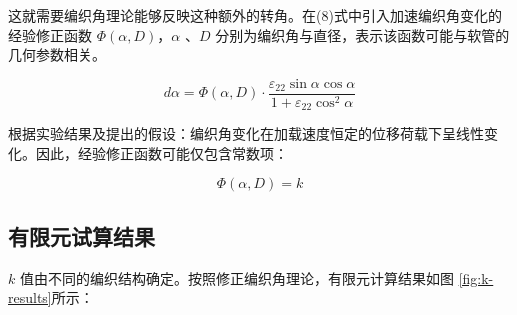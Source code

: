 \begin{figure}[!htp]
{	\label{fig:k-2}
}
	\hspace{0.5cm}
\end{figure}



这就需要编织角理论能够反映这种额外的转角。在(8)式中引入加速编织角变化的经验修正函数 $ \Phi \left( {\alpha ,D} \right) $，$ \alpha  $ 、$ D $ 分别为编织角与直径，表示该函数可能与软管的几何参数相关。
	  
	  

\begin{equation}
d\alpha  = \Phi \left( {\alpha ,D} \right) \cdot \frac{{{\varepsilon _{22}}\sin \alpha \cos \alpha }}{{1 + {\varepsilon _{22}}{{\cos }^2}\alpha }}
\end{equation}


根据实验结果及提出的假设：编织角变化在加载速度恒定的位移荷载下呈线性变化。因此，经验修正函数可能仅包含常数项：


\begin{equation}
\Phi \left( {\alpha , D} \right) = k
\end{equation}


\subsection{有限元试算结果}

$ k $ 值由不同的编织结构确定。按照修正编织角理论，有限元计算结果如图 \ref{fig:k-results}所示： 


